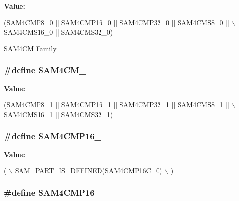 {\bfseries Value\-:}
\begin{DoxyCode}
(SAM4CMP8\_0 || SAM4CMP16\_0 || SAM4CMP32\_0 || SAM4CMS8\_0 || \(\backslash\)
                        SAM4CMS16\_0 || SAM4CMS32\_0)
\end{DoxyCode}
S\-A\-M4\-C\-M Family \hypertarget{group__sam__part__macros__group_ga40dfb0460f36223679de0af78510caab}{
\subsubsection[{S\-A\-M4\-C\-M\-\_\-1}]{\setlength{\rightskip}{0pt plus 5cm}\#define S\-A\-M4\-C\-M\-\_}}\label{group__sam__part__macros__group_ga40dfb0460f36223679de0af78510caab}
{\bfseries Value\-:}
\begin{DoxyCode}
(SAM4CMP8\_1 || SAM4CMP16\_1 || SAM4CMP32\_1 || SAM4CMS8\_1 || \(\backslash\)
                        SAM4CMS16\_1 || SAM4CMS32\_1)
\end{DoxyCode}
\hypertarget{group__sam__part__macros__group_ga3c4d12eff2cac193d008a1a33763cdea}{
\subsubsection[{S\-A\-M4\-C\-M\-P16\-\_\-0}]{\setlength{\rightskip}{0pt plus 5cm}\#define S\-A\-M4\-C\-M\-P16\-\_}}\label{group__sam__part__macros__group_ga3c4d12eff2cac193d008a1a33763cdea}
{\bfseries Value\-:}
\begin{DoxyCode}
( \(\backslash\)
                SAM\_PART\_IS\_DEFINED(SAM4CMP16C\_0) \(\backslash\)
                )
\end{DoxyCode}
\hypertarget{group__sam__part__macros__group_ga1339cdbe5a862d94adeeae3b32f2c8c7}{
\subsubsection[{S\-A\-M4\-C\-M\-P16\-\_\-1}]{\setlength{\rightskip}{0pt plus 5cm}\#define S\-A\-M4\-C\-M\-P16\-\_}}\label{group__sam__part__macros__group_ga1339cdbe5a862d94adeeae3b32f2c8c7}
